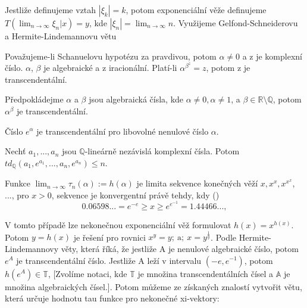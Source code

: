 Jestliže definujeme vztah \(|\xi_k|=k\), potom exponenciální věže
definujeme \(T(\lim_{n \to \infty} \xi_n | x) = y\), kde \(|\xi_n|
= \lim_{n\to \infty} n\). Využijeme Gelfond-Schneiderovu a 
Hermite-Lindemannovu větu \cite{18} \cite{19} \cite{20}

\begin{theorem}
      Považujeme-li Schanuelovu hypotézu \cite{21} za
      pravdivou, potom \(\alpha \neq 0\) a z je komplexní
      číslo. \(\alpha\), \(\beta\) je algebraické a z iracionální.
      Platí-li \(\alpha^{\beta^z}=z\), potom z je transcendentální.
\end{theorem}

\begin{theorem}
      Předpokládejme \( \alpha\) a \(\beta\) jsou algebraická 
      čísla, kde \(\alpha \neq 0, \alpha \neq 1\), a \(\beta \in 
      \mathbb{R}\setminus \mathbb{Q}\), potom \(\alpha^{\beta}\) 
      je transcendentální.
\end{theorem}

\begin{theorem}
      Číslo \(e^\alpha\) je transcendentální pro libovolné
      nenulové číslo \(\alpha\). 
\end{theorem}

\begin{conjecture}
      Nechť \(a_1, ..., a_n\) jsou \(\mathbb{Q}\)-lineárně nezávislá
      komplexní čísla. Potom \(td_{\mathbb{Q}}(a_1, e^{a_1},.
      .., a_n, e^{a_n}) \leq n\).
\end{conjecture}

\begin{definition}
      Funkce \(\lim_{n\to \infty}\tau_n(\alpha) := h(\alpha)\) 
      je limita sekvence konečných věží \(x, x^x, x^{x^x}\), ...,
      pro \(x > 0\), sekvence je konvergentní právě tehdy, kdy (\cite{18})
      \[0.06598... = e^{-e} \geq x \geq e^{e^{-1}}=1.44466...,\]
\end{definition}

V tomto případě lze nekonečnou exponenciální věž formulovat
\(h(x) = x^{h(x)}\). Potom \(y = h(x)\) je řešení pro rovnici 
\(x^y = y; \ \mbox{a}; \ x = y^{\frac{1}{y}}\). Podle Hermite-Lindemannovy 
věty, která říká, že jestliže A je nenulové algebraické číslo, potom \(e^A\)
je transcendentální číslo. Jestliže A leží v intervalu \((-e, e^{-1})\), 
potom \(h(e^A) \in \mathbb{T}\), [Zvolíme notaci, kde \(\mathbb{T}\) je 
množina transcendentálních čísel a \(\mathbb{A}\) je množina algebraických 
čísel.]. Potom můžeme ze získaných znalostí vytvořit větu, která určuje 
hodnotu tau funkce pro nekonečné xi-vektory:

